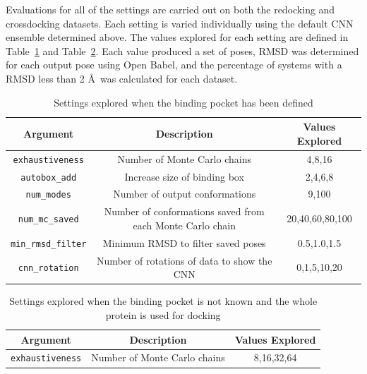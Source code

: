 \documentclass[journal=jcisd8,manuscript=article]{achemso}
\begin{document}
Evaluations for all of the settings are carried out on both the redocking and crossdocking datasets. Each setting is varied individually using the default CNN ensemble determined above. The values explored for each setting are defined in Table~\ref{tab:SettingsExplPocket} and Table~\ref{tab:SettingsExplWP}. Each value produced a set of poses, RMSD was determined for each output pose using Open Babel, and the percentage of systems with a RMSD less than 2 \AA~was calculated for each dataset.
\begin{table}[]
    \centering
    \begin{tabular}{|c|c|c|}
        \hline Argument & Description & Values Explored \\ \hline
         \texttt{exhaustiveness} & Number of Monte Carlo chains & 4,8,16 \\ \hline
         \texttt{autobox\_add} & Increase size of binding box & 2,4,6,8 \\ \hline
         \texttt{num\_modes} & Number of output conformations & 9,100 \\ \hline
         \texttt{num\_mc\_saved} & Number of conformations saved from each Monte Carlo chain & 20,40,60,80,100 \\ \hline
         \texttt{min\_rmsd\_filter} & Minimum RMSD to filter saved poses & 0.5,1.0,1.5 \\ \hline
         \texttt{cnn\_rotation} & Number of rotations of data to show the CNN & 0,1,5,10,20 \\ \hline
    \end{tabular}
    \caption{Settings explored when the binding pocket has been defined}
    \label{tab:SettingsExplPocket}
\end{table}
\begin{table}[]
    \centering
    \begin{tabular}{|c|c|c|}
        \hline Argument & Description & Values Explored \\ \hline
         \texttt{exhaustiveness} & Number of Monte Carlo chains & 8,16,32,64 \\ \hline
    \end{tabular}
    \caption{Settings explored when the binding pocket is not known and the whole protein is used for docking}
    \label{tab:SettingsExplWP}
\end{table}
\end{document}
